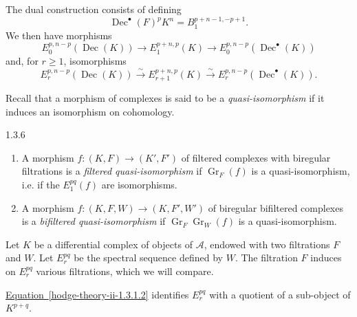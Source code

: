     The dual construction consists of defining
    \[       \operatorname {Dec}^\bullet (F)^pK^n       = B_1^{p+n-1,-p+1}.     \]
    We then have morphisms
    \[       E_0^{p,n-p}(\operatorname {Dec}(K))       \to  E_1^{p+n,p}(K)       \to  E_0^{p,n-p}(\operatorname {Dec}^\bullet (K))     \]
    and, for \(r\geqslant 1\), isomorphisms
    \[       E_r^{p,n-p}(\operatorname {Dec}(K))       \xrightarrow {\sim } E_{r+1}^{p+n,p}(K)       \xrightarrow {\sim } E_{r}^{p,n-p}(\operatorname {Dec}^\bullet (K)).     \]\par{}Recall that a morphism of complexes is said to be a \emph{quasi-isomorphism} if it induces an isomorphism on cohomology.\begin{definition}{1.3.6}\label{hodge-theory-ii-1.3.6}\skipsinglepar\begin{enumerate}
    
 \item[(i)]
      A morphism \(f\colon (K,F)\to (K',F')\) of filtered complexes with biregular filtrations is a \emph{filtered quasi-isomorphism} if \(\operatorname {Gr}_F(f)\) is a quasi-isomorphism, i.e. if the \(E_1^{pq}(f)\) are isomorphisms.
    

    
 \item[(ii)]
      A morphism \(f\colon (K,F,W)\to (K,F',W')\) of biregular bifiltered complexes is a \emph{bifiltered quasi-isomorphism} if \(\operatorname {Gr}_F\operatorname {Gr}_W(f)\) is a quasi-isomorphism.
    

  \end{enumerate}\end{definition}\label{hodge-theory-ii-1.3.7}\par{}Let \(K\) be a differential complex of objects of \(\mathscr {A}\), endowed with two filtrations \(F\) and \(W\).
    Let \(E_r^{pq}\) be the spectral sequence defined by \(W\).
    The filtration \(F\) induces on \(E_r^{pq}\) various filtrations, which we will compare.\label{hodge-theory-ii-1.3.8}\par{}\hyperref[hodge-theory-ii-1.3.1.2]{Equation~\ref*{hodge-theory-ii-1.3.1.2}} identifies \(E_r^{pq}\) with a quotient of a sub-object of \(K^{p+q}\).
